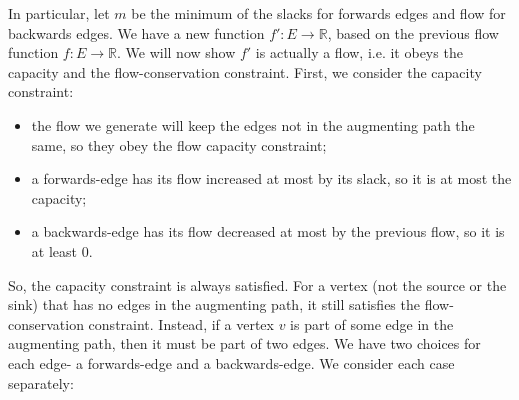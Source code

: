 \documentclass[a4paper, openany]{memoir}
\begin{document}
    In particular, let $m$ be the minimum of the slacks for forwards edges and flow for backwards edges. We have a new function $f' \colon E \to \mathbb{R}$, based on the previous flow function $f \colon E \to \mathbb{R}$. We will now show $f'$ is actually a flow, i.e. it obeys the capacity and the flow-conservation constraint. First, we consider the capacity constraint:
    \begin{itemize}
        \item the flow we generate will keep the edges not in the augmenting path the same, so they obey the flow capacity constraint;
        \item a forwards-edge has its flow increased at most by its slack, so it is at most the capacity;
        \item a backwards-edge has its flow decreased at most by the previous flow, so it is at least 0. 
    \end{itemize}
    So, the capacity constraint is always satisfied. For a vertex (not the source or the sink) that has no edges in the augmenting path, it still satisfies the flow-conservation constraint. Instead, if a vertex $v$ is part of some edge in the augmenting path, then it must be part of two edges. We have two choices for each edge- a forwards-edge and a backwards-edge. We consider each case separately:
\end{document}
